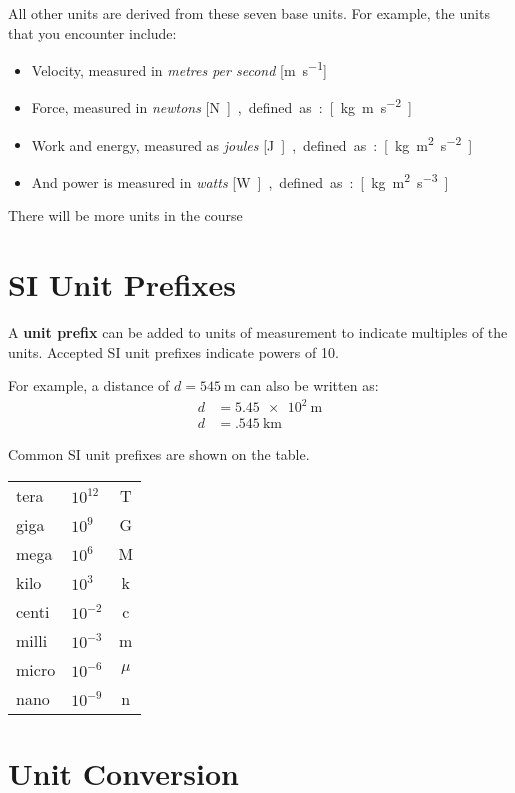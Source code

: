 All other units are derived from these seven base units. For example, the
units that you encounter include:
\begin{itemize}
\item Velocity, measured in \emph{metres per second} [\si{\metre\per\second}]
\item Force, measured in \emph{newtons} [\si\newton], defined as:
  [\si{\kilo\gram\metre\per\second\squared}]
\item Work and energy, measured as \emph{joules} [\si\joule], defined as:
  [\si{\kilo\gram\metre\squared\per\second\squared}]
\item And power is measured in \emph{watts} [\si\watt], defined as:
  [\si{\kilo\gram\metre\squared\per\second\cubed}]
\end{itemize}
There will be more units in the course

%
%
%
\section{SI Unit Prefixes}

A \textbf{unit prefix} can be added to units of measurement to indicate
multiples of the units. Accepted SI unit prefixes indicate powers of 10.

For example, a distance of $d=\SI{545}\metre$ can also be written as:
\begin{align*}
  d &= \SI{5.45e2}\metre\\
  d &= \SI{.545}{\kilo\metre}
\end{align*}

Common SI unit prefixes are shown on the table.
%    
%    
    \begin{tabular}{|l|l|c|}
      \hline
      tera  & $10^{12}$ & T \\
      giga  & $10^9$  & G \\
      mega  & $10^6$  & M \\
      kilo  & $10^3$  & k \\
      centi & $10^{-2}$ & c \\
      milli & $10^{-3}$ & m \\
      micro & $10^{-6}$ & $\mu$ \\
      nano  & $10^{-9}$ & n \\
      \hline
    \end{tabular}
%  




\section{Unit Conversion}

